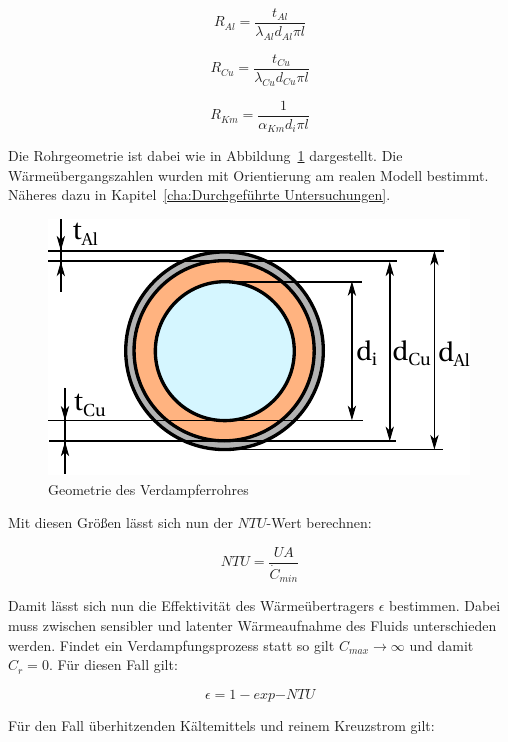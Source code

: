 \begin{equation}
R_{Al} = \frac{t_{Al}}{\lambda_{Al} d_{Al} \pi l}
\end{equation}

\begin{equation}
R_{Cu} = \frac{t_{Cu}}{\lambda_{Cu} d_{Cu} \pi l}
\end{equation}

\begin{equation}
R_{Km} = \frac{1}{\alpha_{Km} d_{i} \pi l}
\end{equation}

Die Rohrgeometrie ist dabei wie in Abbildung~\ref{fig:Geometrie} dargestellt.
Die Wärmeübergangszahlen wurden mit Orientierung am realen Modell bestimmt. Näheres dazu in Kapitel~\ref{cha:Durchgeführte Untersuchungen}.

\begin{figure}[h]
\centering
\includegraphics[scale=1]{Pictures/Rohrgeometrie.pdf}
\caption{Geometrie des Verdampferrohres}
\label{fig:Geometrie}
\end{figure}

Mit diesen Größen lässt sich nun der $NTU$-Wert berechnen:

\begin{equation}
NTU = \frac{UA}{\dot{C}_{min}}
\end{equation}

Damit lässt sich nun die Effektivität des Wärmeübertragers $\epsilon$ bestimmen.
Dabei muss zwischen sensibler und latenter Wärmeaufnahme des Fluids unterschieden werden.
Findet ein Verdampfungsprozess statt so gilt $C_{max}\longrightarrow\infty$ und damit $C_r =0$. Für diesen Fall gilt:

\begin{equation}
\epsilon = 1- exp{-NTU}
\end{equation}

Für den Fall überhitzenden Kältemittels und reinem Kreuzstrom gilt:

